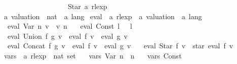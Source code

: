 \begin{isabellebody}
\ \ \ \ \ \ \ \ \ \ \ \ \ \ \ \ \ \ {\isacharbar}{\kern0pt}\ Star\ {\isachardoublequoteopen}{\isacharprime}{\kern0pt}a\ rlexp{\isachardoublequoteclose}\ \ \ \ \ \ \ \ \ \ \ \ \ \ \ \ \ \ \isanewline
\isanewline
{}\isamarkupfalse%
\ {\isacharprime}{\kern0pt}a\ valuation\ {\isacharequal}{\kern0pt}\ {\isachardoublequoteopen}nat\ {\isasymRightarrow}\ {\isacharprime}{\kern0pt}a\ lang{\isachardoublequoteclose}\isanewline
\isanewline
{}\isamarkupfalse%
\ eval\ {\isacharcolon}{\kern0pt}{\isacharcolon}{\kern0pt}\ {\isachardoublequoteopen}{\isacharprime}{\kern0pt}a\ rlexp\ {\isasymRightarrow}\ {\isacharprime}{\kern0pt}a\ valuation\ {\isasymRightarrow}\ {\isacharprime}{\kern0pt}a\ lang{\isachardoublequoteclose}\ \isanewline
\ \ {\isachardoublequoteopen}eval\ {\isacharparenleft}{\kern0pt}Var\ n{\isacharparenright}{\kern0pt}\ v\ {\isacharequal}{\kern0pt}\ v\ n{\isachardoublequoteclose}\ {\isacharbar}{\kern0pt}\isanewline
\ \ {\isachardoublequoteopen}eval\ {\isacharparenleft}{\kern0pt}Const\ l{\isacharparenright}{\kern0pt}\ {\isacharunderscore}{\kern0pt}\ {\isacharequal}{\kern0pt}\ l{\isachardoublequoteclose}\ {\isacharbar}{\kern0pt}\isanewline
\ \ {\isachardoublequoteopen}eval\ {\isacharparenleft}{\kern0pt}Union\ f\ g{\isacharparenright}{\kern0pt}\ v\ {\isacharequal}{\kern0pt}\ eval\ f\ v\ {\isasymunion}\ eval\ g\ v{\isachardoublequoteclose}\ {\isacharbar}{\kern0pt}\isanewline
\ \ {\isachardoublequoteopen}eval\ {\isacharparenleft}{\kern0pt}Concat\ f\ g{\isacharparenright}{\kern0pt}\ v\ {\isacharequal}{\kern0pt}\ eval\ f\ v\ {\isacharat}{\kern0pt}{\isacharat}{\kern0pt}\ eval\ g\ v{\isachardoublequoteclose}\ {\isacharbar}{\kern0pt}\isanewline
\ \ {\isachardoublequoteopen}eval\ {\isacharparenleft}{\kern0pt}Star\ f{\isacharparenright}{\kern0pt}\ v\ {\isacharequal}{\kern0pt}\ star\ {\isacharparenleft}{\kern0pt}eval\ f\ v{\isacharparenright}{\kern0pt}{\isachardoublequoteclose}\isanewline
\isanewline
{}\isamarkupfalse%
\ vars\ {\isacharcolon}{\kern0pt}{\isacharcolon}{\kern0pt}\ {\isachardoublequoteopen}{\isacharprime}{\kern0pt}a\ rlexp\ {\isasymRightarrow}\ nat\ set{\isachardoublequoteclose}\ \isanewline
\ \ {\isachardoublequoteopen}vars\ {\isacharparenleft}{\kern0pt}Var\ n{\isacharparenright}{\kern0pt}\ {\isacharequal}{\kern0pt}\ {\isacharbraceleft}{\kern0pt}n{\isacharbraceright}{\kern0pt}{\isachardoublequoteclose}\ {\isacharbar}{\kern0pt}\isanewline
\ \ {\isachardoublequoteopen}vars\ {\isacharparenleft}{\kern0pt}Const\ {\isacharunderscore}{\kern0pt}{\isacharparenright}{\kern0pt}\ {\isacharequal}{\kern0pt}\ {\isacharbraceleft}{\kern0pt}{\isacharbraceright}{\kern0pt}{\isachardoublequoteclose}\ {\isacharbar}{\kern0pt}\isanewline

\end{isabellebody}
